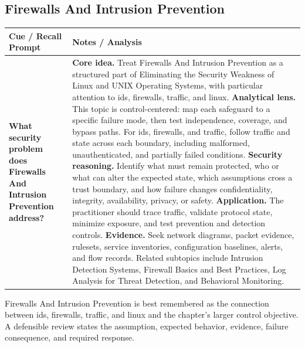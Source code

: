 \documentclass[11pt]{article}
\newcommand{\CornellHeader}{%
\rowcolor{Navy}\color{white}\bfseries Cue / Recall Prompt & \color{white}\bfseries Notes / Analysis\\\hline}
\newcommand{\CornellRow}[2]{%
\cellcolor{CueGray}\RaggedRight\textbf{#1} & \RaggedRight #2\\\hline}
\begin{document}
\subsection*{Firewalls And Intrusion Prevention}
\begin{longtable}{>{\RaggedRight\arraybackslash}p{}|>{\RaggedRight\arraybackslash}p{}}
\CornellHeader
\CornellRow{What security problem does Firewalls And Intrusion Prevention address?}{\textbf{Core idea.} Treat Firewalls And Intrusion Prevention as a structured part of Eliminating the Security Weakness of Linux and UNIX Operating Systems, with particular attention to ids, firewalls, traffic, and linux. \textbf{Analytical lens.} This topic is control-centered: map each safeguard to a specific failure mode, then test independence, coverage, and bypass paths. For ids, firewalls, and traffic, follow traffic and state across each boundary, including malformed, unauthenticated, and partially failed conditions. \textbf{Security reasoning.} Identify what must remain protected, who or what can alter the expected state, which assumptions cross a trust boundary, and how failure changes confidentiality, integrity, availability, privacy, or safety. \textbf{Application.} The practitioner should trace traffic, validate protocol state, minimize exposure, and test prevention and detection controls. \textbf{Evidence.} Seek network diagrams, packet evidence, rulesets, service inventories, configuration baselines, alerts, and flow records. Related subtopics include Intrusion Detection Systems, Firewall Basics and Best Practices, Log Analysis for Threat Detection, and Behavioral Monitoring.}
\end{longtable}
\begin{topicsummary}
Firewalls And Intrusion Prevention is best remembered as the connection between ids, firewalls, traffic, and linux and the chapter's larger control objective. A defensible review states the assumption, expected behavior, evidence, failure consequence, and required response.
\end{topicsummary}
\end{document}
